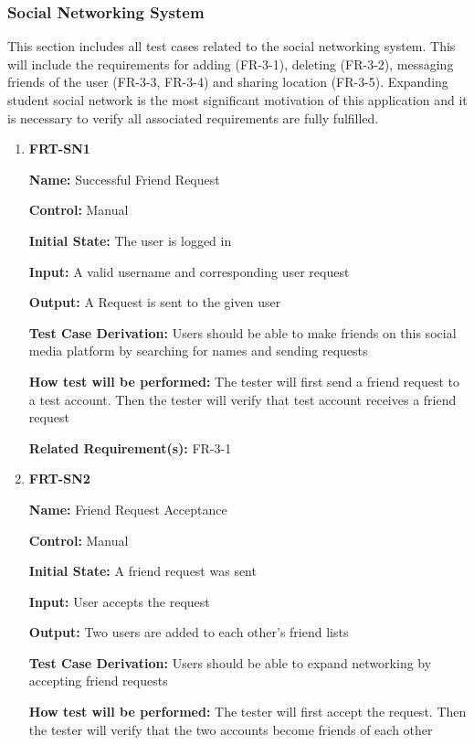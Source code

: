 \documentclass[12pt, titlepage]{article}
\begin{document}
\subsubsection{Social Networking System}

This section includes all test cases related to the social networking system. This will include the requirements for adding (FR-3-1), deleting (FR-3-2), messaging friends of the user (FR-3-3, FR-3-4) and sharing location (FR-3-5). Expanding student social network is the most significant motivation of this application and it is necessary to verify all associated requirements are fully fulfilled.

\begin{enumerate}
\item{\textbf{FRT-SN1}}

\textbf{Name:} Successful Friend Request

\textbf{Control:} Manual
					
\textbf{Initial State:} The user is logged in

\textbf{Input:} A valid username and corresponding user request
					
\textbf{Output:} A Request is sent to the given user

\textbf{Test Case Derivation:} Users should be able to make friends on this social media platform by searching for names and sending requests
					
\textbf{How test will be performed:} The tester will first send a friend request to a test account. Then the tester will verify that test account receives a friend request

\textbf{Related Requirement(s):} FR-3-1

\item{\textbf{FRT-SN2}}

\textbf{Name:} Friend Request Acceptance

\textbf{Control:} Manual
					
\textbf{Initial State:} A friend request was sent

\textbf{Input:} User accepts the request
					
\textbf{Output:} Two users are added to each other's friend lists

\textbf{Test Case Derivation:} Users should be able to expand networking by accepting friend requests
					
\textbf{How test will be performed:} The tester will first accept the request. Then the tester will verify that the two accounts become friends of each other


\end{enumerate}
\end{document}
